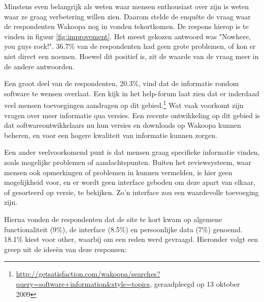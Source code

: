 \documentclass[a4paper, 10pt, pdftex]{report}
\begin{document}
      Minstens even belangrijk als weten waar mensen enthousiast over zijn is weten waar ze graag verbetering willen zien. Daarom stelde de enqu\^ete de vraag waar de respondenten Wakoopa nog in vonden tekortkomen. De respons hierop is te vinden in figuur \ref{fig:improvement}. Het meest gekozen antwoord was "Nowhere, you guys rock!". 36.7\% van de respondenten had geen grote problemen, of kon er niet direct een noemen. Hoewel dit positief is, zit de waarde van de vraag meer in de andere antwoorden.

      Een groot deel van de respondenten, 20.3\%, vind dat de informatie rondom software te wensen overlaat. Een kijk in het help-forum laat zien dat er inderdaad veel mensen toevoegingen aandragen op dit gebied.\footnote{\url{http://getsatisfaction.com/wakoopa/searches?query=software+information&style=topics}, geraadpleegd op 13 oktober 2009} Wat vaak voorkomt zijn vragen over meer informatie qua versies. Een recente ontwikkeling op dit gebied is dat softwareontwikkelaars nu hun versies en downloads op Wakoopa kunnen beheren, en voor een hogere kwaliteit van informatie kunnen zorgen.

      Een ander veelvoorkomend punt is dat mensen graag specifieke informatie vinden, zoals mogelijke problemen of aandachtspunten. Buiten het reviewsysteem, waar mensen ook opmerkingen of problemen in kunnen vermelden, is hier geen mogelijkheid voor, en er wordt geen interface geboden om deze apart van elkaar, of gesorteerd op versie, te bekijken. Zo'n interface zou een waardevolle toevoeging zijn.


      Hierna vonden de respondenten dat de site te kort kwam op algemene functionaliteit (9\%), de interface (8.5\%) en persoonlijke data (7\%) genoemd. 18.1\% kiest voor other, waarbij om een reden werd gevraagd. Hieronder volgt een greep uit de idee\"en van deze responsen:
\end{document}
